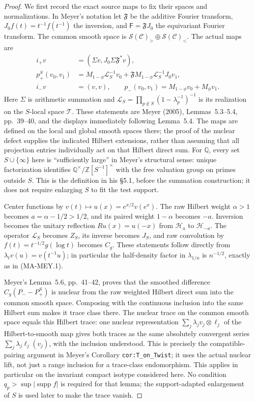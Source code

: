 \begin{proof}
We first record the exact source maps to fix their spaces and
normalizations.  In Meyer's notation let $\mathfrak F$ be the
additive Fourier transform, $J_0 f(t)=t^{-1}f(t^{-1})$ the
inversion, and $\mathsf F=\mathfrak FJ_0$ the equivariant
Fourier transform.  The common smooth space is
$\mathcal S(\mathcal C)_{>}\oplus
 \mathcal S(\mathcal C)_{<}$.
The actual maps are
\begin{align*}
 i_+v&=(\Sigma v,J_0\Sigma\mathfrak F^*v),\\
 p_+^S(v_0,v_1)
   &=M_{1-\phi}\mathcal L_S^{-1}v_0
       +\mathfrak F M_{1-\phi}\mathcal L_S^{-1}J_0v_1,\\
 i_-v&=(v,v),\qquad
 p_-(v_0,v_1)=M_{1-\phi}v_0+M_\phi v_1.
 \tag{MA-MEY.13}
\end{align*}
Here $\Sigma$ is arithmetic summation and
$\mathcal L_S=\prod_{p\notin S}(1-\lambda_p^{-1})^{-1}$
is its realization on the $S$-local space $\mathcal T$.
These statements are Meyer (2005), Lemmas~5.3--5.4,
pp.~39--40, and the displays immediately following Lemma~5.4.
The maps are defined on the local and global smooth spaces
there; the proof of the nuclear defect supplies the indicated
Hilbert extensions, rather than assuming that all projection
entries individually act on that Hilbert direct sum.
For $\mathbb Q$, every set $S\cup\{\infty\}$ here is
``sufficiently large'' in Meyer's structural sense: unique
factorization identifies
$\mathbb Q^\times/\mathbb Z[S^{-1}]^\times$ with the free
valuation group on primes outside $S$. This is the definition
in his \S5.1, before the summation construction; it does not
require enlarging $S$ to fit the test support.

Center functions by $v(t)\mapsto u(x)=e^{x/2}v(e^x)$.
The raw Hilbert weight $\alpha>1$ becomes
$a=\alpha-1/2>1/2$, and its paired weight $1-\alpha$
becomes $-a$.  Inversion becomes the unitary reflection
$Ru(x)=u(-x)$ from $\mathcal H_a$ to $\mathcal H_{-a}$.
The operator $\mathcal L_S$ becomes $Z_S$, its inverse
becomes $J_S$, and raw convolution by
$f(t)=t^{-1/2}g(\log t)$ becomes $C_g$.  These statements
follow directly from $\lambda_t v(u)=v(t^{-1}u)$; in
particular the half-density factor in $\lambda_{1/n}$ is
$n^{-1/2}$, exactly as in (MA-MEY.1).

Meyer's Lemma~5.6, pp.~41--42, proves that the smoothed
difference $C_g(P_- -P_+^S)$ is nuclear from the raw weighted
Hilbert direct sum into the common smooth space.  Composing
with the continuous inclusion into the same Hilbert sum makes
it trace class there. The nuclear trace on the common smooth
space equals this Hilbert trace: one nuclear representation
$\sum_j\lambda_j v_j\otimes\ell_j$ of the Hilbert-to-smooth
map gives both traces as the same absolutely convergent series
$\sum_j\lambda_j\ell_j(v_j)$, with the inclusion understood.
This is precisely the compatible-pairing argument in Meyer's
Corollary \texttt{cor:T\_on\_Twist}; it uses the actual nuclear
lift, not just a range inclusion for a trace-class endomorphism.
This applies in particular on the
invariant compact isotype considered here.  No condition
$q_p>\sup|\operatorname{supp}f|$ is required for that lemma;
the support-adapted enlargement of $S$ is used later to make
the trace vanish.


\end{proof}
